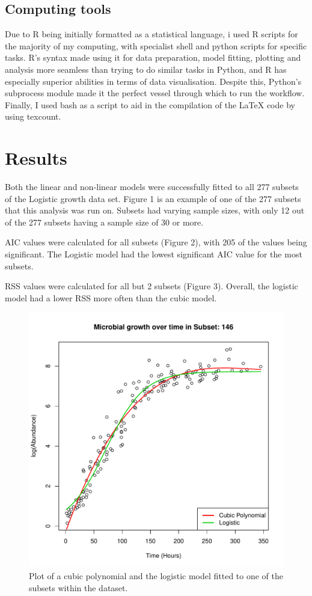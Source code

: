 \documentclass[11pt, titlepage]{article}
\begin{document}
    \subsection*{Computing tools}
	Due to R being initially formatted as a statistical language, i used R scripts for the majority of my computing, with specialist shell and python scripts for specific tasks. R's syntax made using it for data preparation, model fitting, plotting and analysis more seamless than trying to do similar tasks in Python, and R has especially superior abilities in terms of data visualisation. Despite this, Python's subprocess module made it the perfect vessel through which to run the workflow. Finally, I used bash as a script to aid in the compilation of the LaTeX code by using texcount. 
    

    \section*{Results}

	Both the linear and non-linear models were successfully fitted to all 277 subsets of the Logistic growth data set. Figure 1 is an example of one of the 277 subsets that this analysis was run on. Subsets had varying sample sizes, with only 12 out of the 277 subsets having a sample size of 30 or more. 
	
	
	AIC values were calculated for all subsets (Figure 2), with 205 of the values being significant. The Logistic model had the lowest significant AIC value for the most subsets.
	
	RSS values were calculated for all but 2 subsets (Figure 3). Overall, the logistic model had a lower RSS more often than the cubic model. 


    \begin{figure}[H]
    \centering
    \includegraphics[scale=0.75]{../Plots/PlotID146.pdf}
    \caption{Plot of a cubic polynomial and the logistic model fitted to one of the subsets within the dataset.}
    \end{figure}
\end{document}
